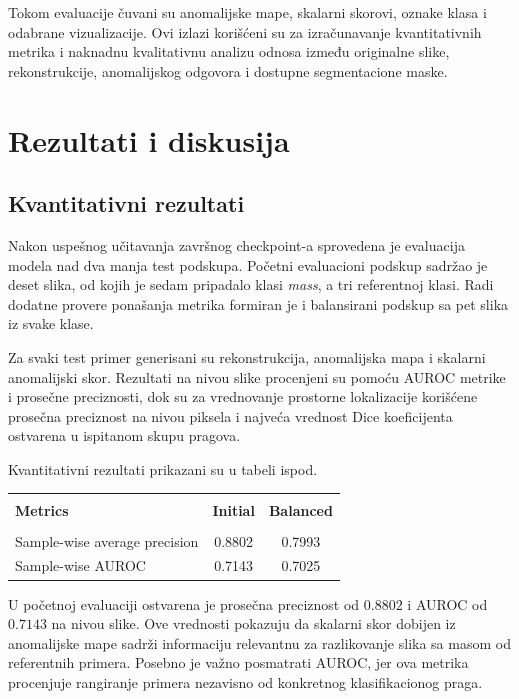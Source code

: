 \documentclass[10pt]{article}
\begin{document}
	Tokom evaluacije čuvani su anomalijske mape, skalarni skorovi, oznake klasa i odabrane vizualizacije. Ovi izlazi korišćeni su za izračunavanje kvantitativnih metrika i naknadnu kvalitativnu analizu odnosa između originalne slike, rekonstrukcije, anomalijskog odgovora i dostupne segmentacione maske.
	
	\section{Rezultati i diskusija}
	
	\subsection{Kvantitativni rezultati}
	
	Nakon uspešnog učitavanja završnog checkpoint-a sprovedena je evaluacija modela nad dva manja test podskupa. Početni evaluacioni podskup sadržao je deset slika, od kojih je sedam pripadalo klasi \textit{mass}, a tri referentnoj klasi. Radi dodatne provere ponašanja metrika formiran je i balansirani podskup sa pet slika iz svake klase.
	
	Za svaki test primer generisani su rekonstrukcija, anomalijska mapa i skalarni anomalijski skor. Rezultati na nivou slike procenjeni su pomoću AUROC metrike i prosečne preciznosti, dok su za vrednovanje prostorne lokalizacije korišćene prosečna preciznost na nivou piksela i najveća vrednost Dice koeficijenta ostvarena u ispitanom skupu pragova.
	
	Kvantitativni rezultati prikazani su u tabeli ispod.
	
	\begin{table}[ht]
		\centering
		\begin{tabular}{lcc}
			\hline \\
			\textbf{Metrics} & \textbf{Initial} & \textbf{Balanced} \\
			\\ \hline
			Sample-wise average precision & 0.8802 & 0.7993 \\
			Sample-wise AUROC & 0.7143 & 0.7025 \\
			\hline
		\end{tabular}
	\end{table}
	
	U početnoj evaluaciji ostvarena je prosečna preciznost od $0.8802$ i AUROC od $0.7143$ na nivou slike. Ove vrednosti pokazuju da skalarni skor dobijen iz anomalijske mape sadrži informaciju relevantnu za razlikovanje slika sa masom od referentnih primera. Posebno je važno posmatrati AUROC, jer ova metrika procenjuje rangiranje primera nezavisno od konkretnog klasifikacionog praga.
	
\end{document}
